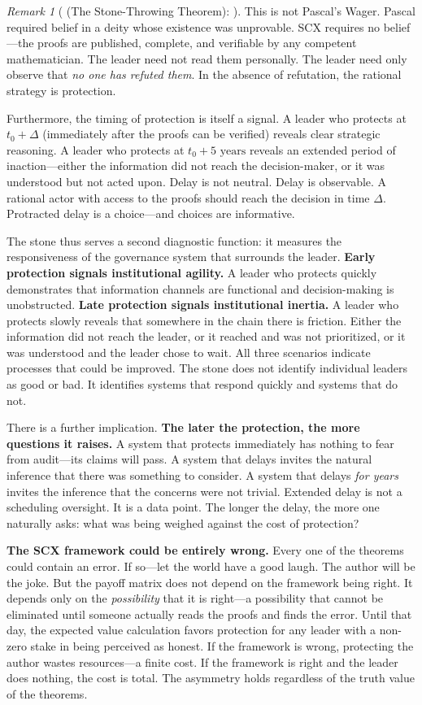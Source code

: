 \documentclass[12pt,a4paper]{article}
\theoremstyle{definition}
\theoremstyle{remark}
\newtheorem{remark}{Remark}[section]
\begin{document}
\begin{remark}[ (The Stone-Throwing Theorem): ]
This is not Pascal's Wager. Pascal required belief in a deity whose existence was unprovable. SCX requires no belief—the proofs are published, complete, and verifiable by any competent mathematician. The leader need not read them personally. The leader need only observe that \textit{no one has refuted them}. In the absence of refutation, the rational strategy is protection.

Furthermore, the timing of protection is itself a signal. A leader who protects at $t_0 + \Delta$ (immediately after the proofs can be verified) reveals clear strategic reasoning. A leader who protects at $t_0 + 5\text{ years}$ reveals an extended period of inaction—either the information did not reach the decision-maker, or it was understood but not acted upon. Delay is not neutral. Delay is observable. A rational actor with access to the proofs should reach the decision in time $\Delta$. Protracted delay is a choice—and choices are informative.

The stone thus serves a second diagnostic function: it measures the responsiveness of the governance system that surrounds the leader. \textbf{Early protection signals institutional agility.} A leader who protects quickly demonstrates that information channels are functional and decision-making is unobstructed. \textbf{Late protection signals institutional inertia.} A leader who protects slowly reveals that somewhere in the chain there is friction. Either the information did not reach the leader, or it reached and was not prioritized, or it was understood and the leader chose to wait. All three scenarios indicate processes that could be improved. The stone does not identify individual leaders as good or bad. It identifies systems that respond quickly and systems that do not.

There is a further implication. \textbf{The later the protection, the more questions it raises.} A system that protects immediately has nothing to fear from audit—its claims will pass. A system that delays invites the natural inference that there was something to consider. A system that delays \textit{for years} invites the inference that the concerns were not trivial. Extended delay is not a scheduling oversight. It is a data point. The longer the delay, the more one naturally asks: what was being weighed against the cost of protection?

\textbf{The SCX framework could be entirely wrong.} Every one of the theorems could contain an error. If so—let the world have a good laugh. The author will be the joke. But the payoff matrix does not depend on the framework being right. It depends only on the \textit{possibility} that it is right—a possibility that cannot be eliminated until someone actually reads the proofs and finds the error. Until that day, the expected value calculation favors protection for any leader with a non-zero stake in being perceived as honest. If the framework is wrong, protecting the author wastes resources—a finite cost. If the framework is right and the leader does nothing, the cost is total. The asymmetry holds regardless of the truth value of the theorems.


\end{remark}
\end{document}
